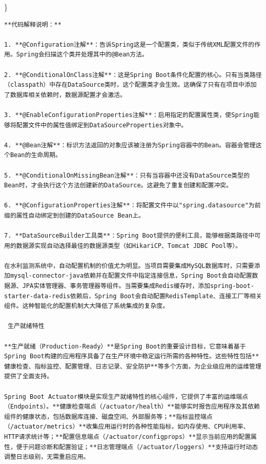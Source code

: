 \}

\begin{lstlisting}
**代码解释说明：**

1. **@Configuration注解**：告诉Spring这是一个配置类，类似于传统XML配置文件的作用。Spring会扫描这个类并处理其中的@Bean方法。

2. **@ConditionalOnClass注解**：这是Spring Boot条件化配置的核心。只有当类路径（classpath）中存在DataSource类时，这个配置类才会生效。这确保了只有在项目中添加了数据库相关依赖时，数据源配置才会激活。

3. **@EnableConfigurationProperties注解**：启用指定的配置属性类，使Spring能够将配置文件中的属性值绑定到DataSourceProperties对象中。

4. **@Bean注解**：标识方法返回的对象应该被注册为Spring容器中的Bean。容器会管理这个Bean的生命周期。

5. **@ConditionalOnMissingBean注解**：只有当容器中还没有DataSource类型的Bean时，才会执行这个方法创建新的DataSource。这避免了重复创建和配置冲突。

6. **@ConfigurationProperties注解**：将配置文件中以"spring.datasource"为前缀的属性自动绑定到创建的DataSource Bean上。

7. **DataSourceBuilder工具类**：Spring Boot提供的便利工具，能够根据类路径中可用的数据源实现自动选择最佳的数据源类型（如HikariCP、Tomcat JDBC Pool等）。

在水利监测系统中，自动配置机制的价值尤为明显。当项目需要集成MySQL数据库时，只需要添加mysql-connector-java依赖并在配置文件中指定连接信息，Spring Boot会自动配置数据源、JPA实体管理器、事务管理器等组件。当需要集成Redis缓存时，添加spring-boot-starter-data-redis依赖后，Spring Boot会自动配置RedisTemplate、连接工厂等相关组件。这种智能化的配置机制大大降低了系统集成的复杂度。

 生产就绪特性

**生产就绪（Production-Ready）**是Spring Boot的重要设计目标，它意味着基于Spring Boot构建的应用程序具备了在生产环境中稳定运行所需的各种特性。这些特性包括**健康检查、指标监控、配置管理、日志记录、安全防护**等多个方面，为企业级应用的运维管理提供了全面支持。

Spring Boot Actuator模块是实现生产就绪特性的核心组件，它提供了丰富的运维端点（Endpoints）。**健康检查端点（/actuator/health）**能够实时报告应用程序及其依赖组件的健康状态，包括数据库连接、磁盘空间、外部服务等；**指标监控端点（/actuator/metrics）**收集应用运行时的各种性能指标，如内存使用、CPU利用率、HTTP请求统计等；**配置信息端点（/actuator/configprops）**显示当前应用的配置属性，便于问题诊断和配置验证；**日志管理端点（/actuator/loggers）**支持运行时动态调整日志级别，无需重启应用。


\end{lstlisting}
